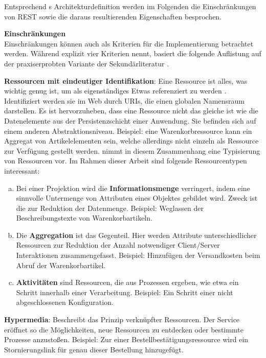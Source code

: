 \documentclass[12pt,a4paper,bibliography=totocnumbered,listof=totoc]{scrartcl}
\begin{document}
Entsprechend \citeauthor{tilkov11}s Architekturdefinition werden im Folgenden die Einschränkungen von REST sowie die daraus resultierenden Eigenschaften besprochen.

\textbf{Einschränkungen}\\
Einschränkungen können auch als Kriterien für die Implementierung betrachtet werden. Während \citeauthor{fielding00} explizit vier Kriterien nennt, basiert die folgende Auflistung auf der praxiserprobten Variante der Sekundärliteratur \citep{wilde11, tilkov11}.

\begin{compactitem}
\item \textbf{Ressourcen mit eindeutiger Identifikation}: \glqq Eine Ressource ist alles, was wichtig genug ist, um als eigenständiges Etwas referenziert zu werden\grqq{} \citep{richardson07}. Identifiziert werden sie im Web durch URIs, die einen globalen Namensraum darstellen.  Es ist hervorzuheben, dass eine Ressource nicht das gleiche ist wie die Datenelemente aus der Persistenzschicht einer Anwendung. Sie befinden sich auf einem anderen Abstraktionsniveau. Beispiel: eine Warenkorbressource kann ein Aggregat von Artikelelementen sein, welche allerdings nicht einzeln als Ressource zur Verfügung gestellt werden. \citeauthor{tilkov11} nimmt in diesem Zusammenhang eine Typisierung von Ressourcen vor. Im Rahmen dieser Arbeit sind folgende Ressourcentypen interessant:
\begin{enumerate}[a.]
\item Bei einer Projektion wird die \textbf{Informationsmenge} verringert, indem eine sinnvolle Untermenge von Attributen eines Objektes gebildet wird. Zweck ist die zur Reduktion der Datenmenge. Beispiel: Weglassen der Beschreibungstexte von Warenkorbartikeln.
\item Die \textbf{Aggregation} ist das Gegenteil. Hier werden Attribute unterschiedlicher Ressourcen zur Reduktion der Anzahl notwendiger Client/Server Interaktionen zusammengefasst. Beispiel: Hinzufügen der Versandkosten beim Abruf der Warenkorbartikel.
\item \textbf{Aktivitäten} sind Ressourcen, die aus Prozessen ergeben, wie etwa ein Schritt innerhalb einer Verarbeitung. Beispiel: Ein Schritt einer nicht abgeschlossenen Konfiguration.
\end{enumerate}
\item \textbf{Hypermedia}: Beschreibt das Prinzip verknüpfter Ressourcen. Der Service eröffnet so die Möglichkeiten, neue Ressourcen zu entdecken oder bestimmte Prozesse anzustoßen. Beispiel: Zur einer Bestellbestätigungsressource wird ein Stornierungslink für genau dieser Bestellung hinzugefügt.

\end{compactitem}
\end{document}
